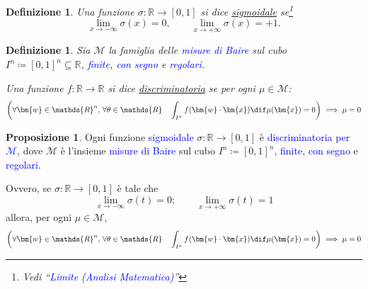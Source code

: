 \documentclass[10pt]{book}
\newcommand{\1}{\mathds{1}}
\newcommand{\R}{\mathds{R}}
\theoremstyle{definition}%
\newtheorem{prop}[thm]{Proposizione}
\theoremstyle{plain}
\newtheorem{definizione}[thm]{Definizione}
\theoremstyle{remark}
\renewcommand{\href}[2]{\textcolor{blue}{#2}}
\begin{document}
\begin{definizione}
Una funzione \(\sigma:\R\to [0,1]\) si dice \uline{sigmoidale} se\footnote{Vedi ``\href{../../../../../org/roam/20250625110412-limite_analisi_matematica.org}{Limite (Analisi Matematica)}''}
\begin{equation*}
\lim_{x\to-\infty} \sigma(x) = 0,\qquad \lim_{x\to +\infty} \sigma(x)= +1.
\end{equation*}
\end{definizione}
\begin{definizione}
Sia \(\mathcal{M}\) la famiglia delle \href{../../../../../org/roam/20250625104200-misura_di_baire.org}{misure di Baire} sul cubo \(I^{n} \coloneqq [0,1]^{n} \subseteq \R\), \href{../../../../../org/roam/20250625110016-misura_finita.org}{finite}, \href{../../../../../org/roam/20250625110024-misura_con_segno.org}{con segno} e \href{../../../../../org/roam/20250625110032-misura_regolare.org}{regolari}.

Una funzione \(f: \R\to \R\) si dice \uline{discriminatoria} se per ogni \(\mu \in \mathcal{M}\):
\begin{equation*}
\left(\forall \bm{w} \in \R^{n},\, \forall \theta \in \R\quad \int_{I^{n}} f(\bm{w}\cdot\bm{x}) \dif \mu(\bm{x}) = 0\right)\implies \mu=0
\end{equation*}
\end{definizione}
\begin{prop}
Ogni funzione \href{../../../../../org/roam/20250625110110-funzione_sigmoidale.org}{sigmoidale} \(\sigma:\R\to [0,1]\) è \href{../../../../../org/roam/20250625105528-funzione_discriminatoria_per_una_misura_di_baire_sul_cubo_unitario.org}{discriminatoria per \(\mathcal{M}\)}, dove \(\mathcal{M}\) è l'insieme \href{../../../../../org/roam/20250625104200-misura_di_baire.org}{misure di Baire} sul cubo \(I^{n} \coloneqq [0,1]^{n}\), \href{../../../../../org/roam/20250625110016-misura_finita.org}{finite}, \href{../../../../../org/roam/20250625110024-misura_con_segno.org}{con segno} e \href{../../../../../org/roam/20250625110032-misura_regolare.org}{regolari}.

Ovvero, se \(\sigma:\R\to [0,1]\) è tale che
\begin{equation*}
\lim_{x\to-\infty}\sigma(t) =0;\qquad \lim_{x\to+\infty}\sigma(t)=1
\end{equation*}
allora, per ogni \(\mu \in \mathcal{M}\),
\begin{equation*}
\left(\forall \bm{w} \in \R^{n},\, \forall \theta \in \R\quad \int_{I^{n}} f(\bm{w}\cdot\bm{x}) \dif \mu(\bm{x}) = 0\right)\implies \mu=0
\end{equation*}
\end{prop}
\end{document}
